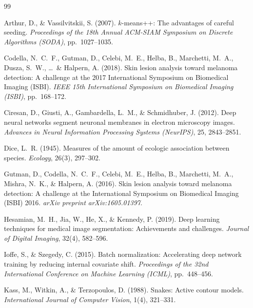 \documentclass[12pt,a4paper]{article}
\begin{document}
\begin{thebibliography}{99}

Arthur, D., \& Vassilvitskii, S. (2007).
\newblock $k$-means++: The advantages of careful seeding.
\newblock \textit{Proceedings of the 18th Annual ACM-SIAM Symposium on Discrete Algorithms (SODA)}, pp.~1027--1035.

Codella, N.~C.~F., Gutman, D., Celebi, M.~E., Helba, B., Marchetti, M.~A., Dusza, S.~W., \ldots\ \& Halpern, A. (2018).
\newblock Skin lesion analysis toward melanoma detection: A challenge at the 2017 International Symposium on Biomedical Imaging (ISBI).
\newblock \textit{IEEE 15th International Symposium on Biomedical Imaging (ISBI)}, pp.~168--172.

Ciresan, D., Giusti, A., Gambardella, L.~M., \& Schmidhuber, J. (2012).
\newblock Deep neural networks segment neuronal membranes in electron microscopy images.
\newblock \textit{Advances in Neural Information Processing Systems (NeurIPS)}, 25, 2843--2851.

Dice, L.~R. (1945).
\newblock Measures of the amount of ecologic association between species.
\newblock \textit{Ecology}, 26(3), 297--302.

Gutman, D., Codella, N.~C.~F., Celebi, M.~E., Helba, B., Marchetti, M.~A., Mishra, N.~K., \& Halpern, A. (2016).
\newblock Skin lesion analysis toward melanoma detection: A challenge at the International Symposium on Biomedical Imaging (ISBI) 2016.
\newblock \textit{arXiv preprint arXiv:1605.01397}.

Hesamian, M.~H., Jia, W., He, X., \& Kennedy, P. (2019).
\newblock Deep learning techniques for medical image segmentation: Achievements and challenges.
\newblock \textit{Journal of Digital Imaging}, 32(4), 582--596.

Ioffe, S., \& Szegedy, C. (2015).
\newblock Batch normalization: Accelerating deep network training by reducing internal covariate shift.
\newblock \textit{Proceedings of the 32nd International Conference on Machine Learning (ICML)}, pp.~448--456.

Kass, M., Witkin, A., \& Terzopoulos, D. (1988).
\newblock Snakes: Active contour models.
\newblock \textit{International Journal of Computer Vision}, 1(4), 321--331.


\end{thebibliography}
\end{document}

